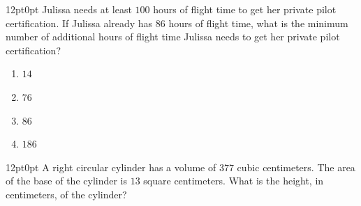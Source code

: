 \documentclass[11pt, twocolumn]{article}
\newcounter{questionnum}
\begin{document}
\vspace{6pt}\noindent
\begin{minipage}{\columnwidth}\raggedright
\noindent{}\par\vspace{8pt}
\begin{adjustwidth}{12pt}{0pt}
Julissa needs at least $100$ hours of flight time to get her private pilot certification. If Julissa already has $86$ hours of flight time, what is the minimum number of additional hours of flight time Julissa needs to get her private pilot certification?
\begin{enumerate}[label=\Alph*),leftmargin=18pt,topsep=3pt,itemsep=2pt]
  \item $14$
  \item $76$
  \item $86$
  \item $186$
\end{enumerate}
\end{adjustwidth}
\end{minipage}\par

\vspace{6pt}\noindent
\begin{minipage}{\columnwidth}\raggedright
\noindent{}\par\vspace{8pt}
\begin{adjustwidth}{12pt}{0pt}
A right circular cylinder has a volume of $377$ cubic centimeters. The area of the base of the cylinder is $13$ square centimeters. What is the height, in centimeters, of the cylinder?
\end{adjustwidth}
\end{minipage}\par
\end{document}
